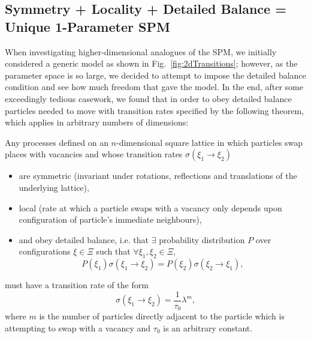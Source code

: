\subsection{Symmetry + Locality + Detailed Balance = Unique 1-Parameter SPM} \label{sec:uniqueProof}
When investigating higher-dimensional analogues of the SPM, we initially considered a generic model as shown in Fig.~\ref{fig:2dTransitions}; however, as the parameter space is so large, we decided to attempt to impose the detailed
balance condition and see how much freedom that gave the model. In the end, after some exceedingly tedious casework, we found that in order to obey detailed balance particles needed to move with transition rates
specified by the following theorem, which applies in arbitrary numbers of dimensions:
\begin{theorem}
\label{thm:ndSPM}
 Any processes defined on an $n$-dimensional square lattice in which particles swap places with vacancies and whose transition rates $\sigma(\xi_1 \rightarrow \xi_2)$
 \begin{itemize}
  \item are symmetric (invariant under rotations, reflections and translations of the underlying lattice),
  \item local (rate at which a particle swaps with a vacancy only depends upon configuration of particle's immediate neighbours),
  \item and obey detailed balance, i.e. that $\exists$ probability distribution $P$ over configurations $\xi \in \Xi$ such that $\forall \xi_1 , \xi_2 \in \Xi $,
  \begin{equation}
    P(\xi_1) \sigma(\xi_1 \rightarrow \xi_2) = P(\xi_2) \sigma(\xi_2 \rightarrow \xi_1),
  \end{equation}  
 \end{itemize}
must have a transition rate of the form
\begin{equation}
 \sigma(\xi_1 \rightarrow \xi_2) = \frac{1}{\tau_0} \lambda^m ,
\end{equation}
where $m$ is the number of particles directly adjacent to the particle which is attempting to swap with a vacancy and $\tau_0$ is an arbitrary constant.
\end{theorem}

